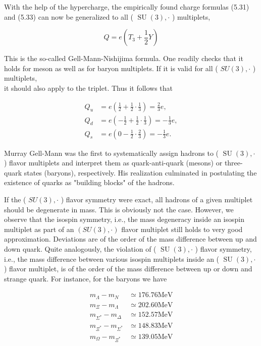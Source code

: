 \documentclass[10pt, letterpaper]{article}
\begin{document}
With the help of the hypercharge, the empirically found charge formulas (5.31) and (5.33) can now be generalized to all ( $\operatorname{SU}(3), \cdot$ ) multiplets,

$$
Q=e\left(T_{3}+\frac{1}{2} Y\right)
$$

This is the so-called Gell-Mann-Nishijima formula. One readily checks that it holds for meson as well as for baryon multiplets. If it is valid for all ( $S U(3), \cdot$ ) multiplets,\\
it should also apply to the triplet. Thus it follows that

$$
\begin{aligned}
Q_{u} & =e\left(\frac{1}{2}+\frac{1}{2} \cdot \frac{1}{3}\right)=\frac{2}{3} e, \\
Q_{d} & =e\left(-\frac{1}{2}+\frac{1}{2} \cdot \frac{1}{3}\right)=-\frac{1}{3} e, \\
Q_{s} & =e\left(0-\frac{1}{2} \cdot \frac{2}{3}\right)=-\frac{1}{3} e .
\end{aligned}
$$

Murray Gell-Mann was the first to systematically assign hadrons to ( $\operatorname{SU}(3), \cdot$ ) flavor multiplets and interpret them as quark-anti-quark (mesons) or three-quark states (baryons), respectively. His realization culminated in postulating the existence of quarks as "building blocks" of the hadrons.

If the ( $S U(3), \cdot$ ) flavor symmetry were exact, all hadrons of a given multiplet should be degenerate in mass. This is obviously not the case. However, we observe that the isospin symmetry, i.e., the mass degeneracy inside an isospin multiplet as part of an $(S U(3), \cdot)$ flavor multiplet still holds to very good approximation. Deviations are of the order of the mass difference between up and down quark. Quite analogously, the violation of ( $\operatorname{SU}(3), \cdot$ ) flavor symmetry, i.e., the mass difference between various isospin multiplets inside an ( $\operatorname{SU}(3), \cdot$ ) flavor multiplet, is of the order of the mass difference between up or down and strange quark. For instance, for the baryons we have

$$
\begin{aligned}
m_{\Lambda}-m_{N} & \simeq 176.76 \mathrm{MeV} \\
m_{\Xi}-m_{\Lambda} & \simeq 202.60 \mathrm{MeV} \\
m_{\Sigma^{*}}-m_{\Delta} & \simeq 152.57 \mathrm{MeV} \\
m_{\Xi^{*}}-m_{\Sigma^{*}} & \simeq 148.83 \mathrm{MeV} \\
m_{\Omega}-m_{\Xi^{*}} & \simeq 139.05 \mathrm{MeV}
\end{aligned}
$$
\end{document}
